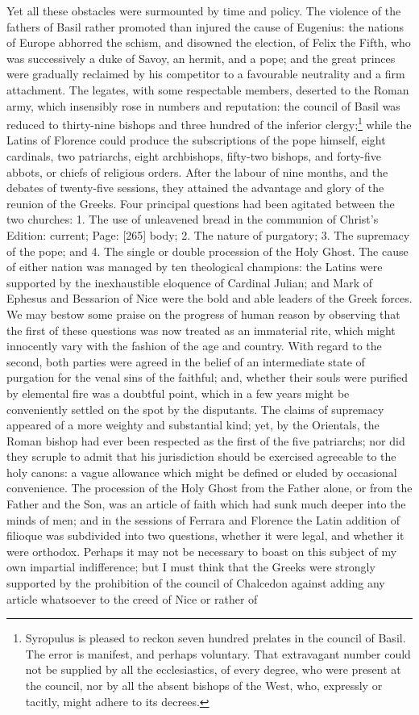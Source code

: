 Yet all these obstacles were surmounted by time and policy. The violence of the fathers of Basil rather promoted than injured the cause of Eugenius: the nations of Europe abhorred the schism, and disowned the election, of Felix the Fifth, who was successively a duke of Savoy, an hermit, and a pope; and the great princes were gradually reclaimed by his competitor to a favourable neutrality and a firm attachment. The legates, with some respectable members, deserted to the Roman army, which insensibly rose in numbers and reputation: the council of Basil was reduced to thirty-nine bishops and three hundred of the inferior clergy;\footnote{Syropulus is pleased to reckon seven hundred prelates in the council of Basil. The error is manifest, and perhaps voluntary. That extravagant number could not be supplied by all the ecclesiastics, of every degree, who were present at the council, nor by all the absent bishops of the West, who, expressly or tacitly, might adhere to its decrees.} while the Latins of Florence could produce the subscriptions of the pope himself, eight cardinals, two patriarchs, eight archbishops, fifty-two bishops, and forty-five abbots, or chiefs of religious orders. After the labour of nine months, and the debates of twenty-five sessions, they attained the advantage and glory of the reunion of the Greeks. Four principal questions had been agitated between the two churches: 1. The use of unleavened bread in the communion of Christ\texthebrew{}’s Edition: current; Page: [265] body; 2. The nature of purgatory; 3. The supremacy of the pope; and 4. The single or double procession of the Holy Ghost. The cause of either nation was managed by ten theological champions: the Latins were supported by the inexhaustible eloquence of Cardinal Julian; and Mark of Ephesus and Bessarion of Nice were the bold and able leaders of the Greek forces. We may bestow some praise on the progress of human reason by observing that the first of these questions was now treated as an immaterial rite, which might innocently vary with the fashion of the age and country. With regard to the second, both parties were agreed in the belief of an intermediate state of purgation for the venal sins of the faithful; and, whether their souls were purified by elemental fire was a doubtful point, which in a few years might be conveniently settled on the spot by the disputants. The claims of supremacy appeared of a more weighty and substantial kind; yet, by the Orientals, the Roman bishop had ever been respected as the first of the five patriarchs; nor did they scruple to admit that his jurisdiction should be exercised agreeable to the holy canons: a vague allowance which might be defined or eluded by occasional convenience. The procession of the Holy Ghost from the Father alone, or from the Father and the Son, was an article of faith which had sunk much deeper into the minds of men; and in the sessions of Ferrara and Florence the Latin addition of filioque was subdivided into two questions, whether it were legal, and whether it were orthodox. Perhaps it may not be necessary to boast on this subject of my own impartial indifference; but I must think that the Greeks were strongly supported by the prohibition of the council of Chalcedon against adding any article whatsoever to the creed of Nice or rather of 